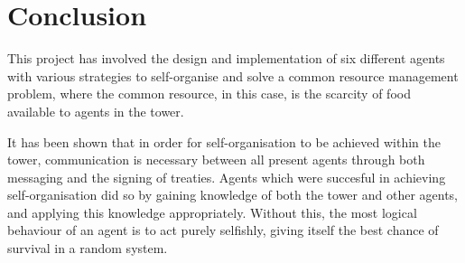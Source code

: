 \chapter{Conclusion}\label{conclusion}

This project has involved the design and implementation of six different agents with various strategies to self-organise and solve a common resource management problem, where the common resource, in this case, is the scarcity of food available to agents in the tower.

It has been shown that in order for self-organisation to be achieved within the tower, communication is necessary between all present agents through both messaging and the signing of treaties. Agents which were succesful in achieving self-organisation did so by gaining knowledge of both the tower and other agents, and applying this knowledge appropriately. Without this, the most logical behaviour of an agent is to act purely selfishly, giving itself the best chance of survival in a random system.